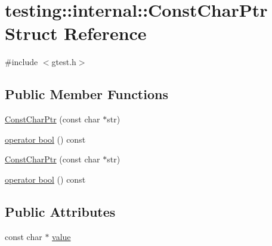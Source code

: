 \hypertarget{structtesting_1_1internal_1_1_const_char_ptr}{\section{testing\-:\-:internal\-:\-:Const\-Char\-Ptr Struct Reference}
\label{structtesting_1_1internal_1_1_const_char_ptr}
}


{\ttfamily \#include $<$gtest.\-h$>$}

\subsection*{Public Member Functions}
\begin{DoxyCompactItemize}
\item 
\hyperlink{structtesting_1_1internal_1_1_const_char_ptr_ae94f6453fa679d815994eccc63062907}{Const\-Char\-Ptr} (const char $\ast$str)
\item 
\hyperlink{structtesting_1_1internal_1_1_const_char_ptr_a891bc286350b81d1a147101c0bae5b1d}{operator bool} () const 
\item 
\hyperlink{structtesting_1_1internal_1_1_const_char_ptr_ae94f6453fa679d815994eccc63062907}{Const\-Char\-Ptr} (const char $\ast$str)
\item 
\hyperlink{structtesting_1_1internal_1_1_const_char_ptr_a891bc286350b81d1a147101c0bae5b1d}{operator bool} () const 
\end{DoxyCompactItemize}
\subsection*{Public Attributes}
\begin{DoxyCompactItemize}
\item 
const char $\ast$ \hyperlink{structtesting_1_1internal_1_1_const_char_ptr_a39e195c4214c28f7b1a7dd711742c56e}{value}
\end{DoxyCompactItemize}


